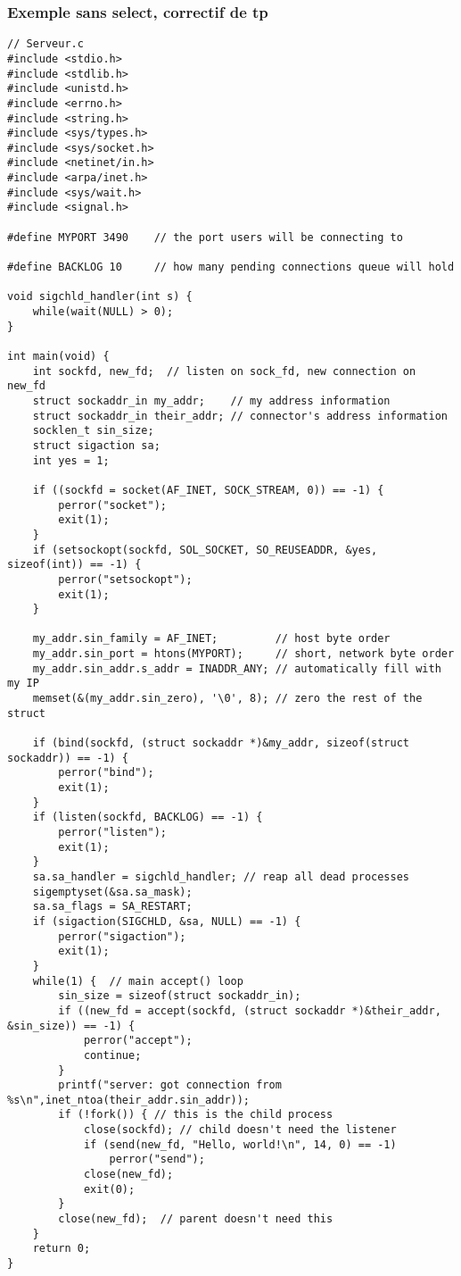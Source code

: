 \documentclass[a4paper]{article}
\begin{document}
\subsubsection{Exemple sans select, correctif de tp}
\begin{lstlisting}
// Serveur.c
#include <stdio.h>
#include <stdlib.h>
#include <unistd.h>
#include <errno.h>
#include <string.h>
#include <sys/types.h>
#include <sys/socket.h>
#include <netinet/in.h>
#include <arpa/inet.h>
#include <sys/wait.h>
#include <signal.h>

#define MYPORT 3490    // the port users will be connecting to

#define BACKLOG 10     // how many pending connections queue will hold

void sigchld_handler(int s) {
    while(wait(NULL) > 0);
}

int main(void) {
    int sockfd, new_fd;  // listen on sock_fd, new connection on new_fd
    struct sockaddr_in my_addr;    // my address information
    struct sockaddr_in their_addr; // connector's address information
    socklen_t sin_size;
    struct sigaction sa;
    int yes = 1;

    if ((sockfd = socket(AF_INET, SOCK_STREAM, 0)) == -1) {
        perror("socket");
        exit(1);
    }
    if (setsockopt(sockfd, SOL_SOCKET, SO_REUSEADDR, &yes, sizeof(int)) == -1) {
        perror("setsockopt");
        exit(1);
    }
    
    my_addr.sin_family = AF_INET;         // host byte order
    my_addr.sin_port = htons(MYPORT);     // short, network byte order
    my_addr.sin_addr.s_addr = INADDR_ANY; // automatically fill with my IP
    memset(&(my_addr.sin_zero), '\0', 8); // zero the rest of the struct

    if (bind(sockfd, (struct sockaddr *)&my_addr, sizeof(struct sockaddr)) == -1) {
        perror("bind");
        exit(1);
    }
    if (listen(sockfd, BACKLOG) == -1) {
        perror("listen");
        exit(1);
    }
    sa.sa_handler = sigchld_handler; // reap all dead processes
    sigemptyset(&sa.sa_mask);
    sa.sa_flags = SA_RESTART;
    if (sigaction(SIGCHLD, &sa, NULL) == -1) {
        perror("sigaction");
        exit(1);
    }
    while(1) {  // main accept() loop
        sin_size = sizeof(struct sockaddr_in);
        if ((new_fd = accept(sockfd, (struct sockaddr *)&their_addr, &sin_size)) == -1) {
            perror("accept");
            continue;
        }
        printf("server: got connection from %s\n",inet_ntoa(their_addr.sin_addr));
        if (!fork()) { // this is the child process
            close(sockfd); // child doesn't need the listener
            if (send(new_fd, "Hello, world!\n", 14, 0) == -1)
                perror("send");
            close(new_fd);
            exit(0);
        }
        close(new_fd);  // parent doesn't need this
    }
    return 0;
}
\end{lstlisting}
\end{document}
